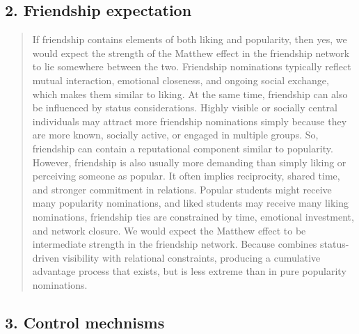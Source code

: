 \documentclass[
  letterpaper,
  DIV=11,
  numbers=noendperiod]{scrartcl}
\begin{document}
\subsection{2. Friendship expectation}\label{friendship-expectation}

\begin{quote}
If friendship contains elements of both liking and popularity, then yes,
we would expect the strength of the Matthew effect in the friendship
network to lie somewhere between the two. Friendship nominations
typically reflect mutual interaction, emotional closeness, and ongoing
social exchange, which makes them similar to liking. At the same time,
friendship can also be influenced by status considerations. Highly
visible or socially central individuals may attract more friendship
nominations simply because they are more known, socially active, or
engaged in multiple groups. So, friendship can contain a reputational
component similar to popularity. However, friendship is also usually
more demanding than simply liking or perceiving someone as popular. It
often implies reciprocity, shared time, and stronger commitment in
relations. Popular students might receive many popularity nominations,
and liked students may receive many liking nominations, friendship ties
are constrained by time, emotional investment, and network closure. We
would expect the Matthew effect to be intermediate strength in the
friendship network. Because combines status-driven visibility with
relational constraints, producing a cumulative advantage process that
exists, but is less extreme than in pure popularity nominations.
\end{quote}

\subsection{3. Control mechnisms}\label{control-mechnisms}
\end{document}
